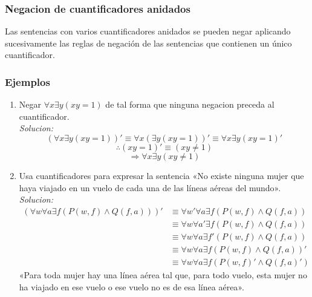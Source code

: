 \documentclass[]{article}
\begin{document}
\subsubsection*{Negacion de cuantificadores anidados}

Las sentencias con varios cuantificadores anidados se pueden negar aplicando sucesivamente las reglas de negación de las sentencias que contienen un único cuantificador.

\subsubsection*{Ejemplos}

\begin{enumerate}
	\item Negar $\forall{x}\exists{y} (xy = 1)$ de tal forma que ninguna negacion preceda al cuantificador.\\
	\textit{Solucion:}
	\begin{equation*}
		(\forall{x}\exists{y} (xy = 1))' \equiv \forall{x}(\exists{y} (xy = 1))' \equiv \forall{x}\exists{y} (xy = 1)'
	\end{equation*}
	\begin{equation*}
		\therefore (xy = 1)' \equiv (xy\neq1)
	\end{equation*}
	\begin{equation*}
		\Rightarrow \forall{x}\exists{y} (xy\neq1)
	\end{equation*}
	
	\item Usa cuantificadores para expresar la sentencia «No existe ninguna mujer que haya viajado en un vuelo de cada una de las líneas aéreas del mundo».\\
	\textit{Solucion:}
	\begin{equation}
		\begin{aligned}
			(\forall{w}\forall{a}\exists{f} (P(w, f) \wedge Q(f, a)))' &\equiv \forall{w}'\forall{a}\exists{f} (P(w, f) \wedge Q(f, a))\\
			&\equiv \forall{w}\forall{a}'\exists{f} (P(w, f) \wedge Q(f, a))\\
			&\equiv \forall{w}\forall{a}\exists{f}' (P(w, f) \wedge Q(f, a))\\
			&\equiv \forall{w}\forall{a}\exists{f} (P(w, f) \wedge Q(f, a))'\\
			&\equiv \forall{w}\forall{a}\exists{f} (P(w, f)' \wedge Q(f, a)')
		\end{aligned}
	\end{equation}
	«Para toda mujer hay una línea aérea tal que, para todo vuelo,
	esta mujer no ha viajado en ese vuelo o ese vuelo no es de esa línea aérea».
\end{enumerate}
\end{document}
